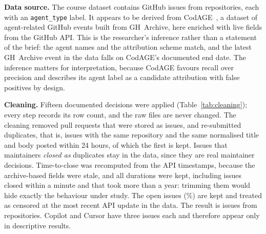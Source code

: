\textbf{Data source.} The course dataset contains \NRaw{} GitHub issues from \NReposRaw{} repositories, each with an \texttt{agent\_type} label. It appears to be derived from CodAGE~\cite{ghaleb2026codage}, a dataset of agent-related GitHub events built from GH~Archive, here enriched with live fields from the GitHub API. This is the researcher's inference rather than a statement of the brief: the agent names and the attribution scheme match, and the latest GH~Archive event in the data falls on CodAGE's documented end date. The inference matters for interpretation, because CodAGE favours recall over precision and describes its agent label as a candidate attribution with false positives by design.

\textbf{Cleaning.} Fifteen documented decisions were applied (Table~\ref{tab:cleaning}); every step records its row count, and the raw files are never changed. The cleaning removed \NPR{} pull requests that were stored as issues, and \NDup{} re-submitted duplicates, that is, issues with the same repository and the same normalised title and body posted within 24 hours, of which the first is kept. Issues that maintainers \emph{closed as} duplicates stay in the data, since they are real maintainer decisions. Time-to-close was recomputed from the API timestamps, because the archive-based fields were stale, and all durations were kept, including \NInstant{} issues closed within a minute and \NOverYear{} that took more than a year: trimming them would hide exactly the behaviour under study. The \NOpen{} open issues (\PctOpen\%) are kept and treated as censored at the most recent API update in the data. The result is \NIssues{} issues from \NRepos{} repositories. Copilot and Cursor have three issues each and therefore appear only in descriptive results.

